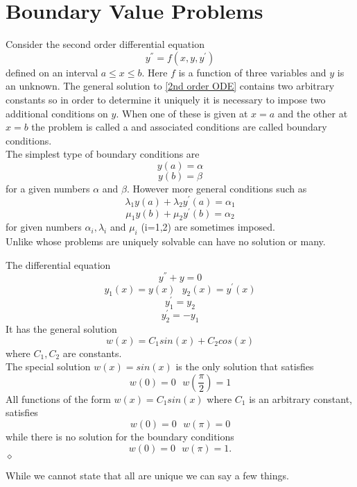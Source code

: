 \section{Boundary Value Problems}
Consider the second order differential equation
\begin{equation}
\label{2nd order ODE}
y^{''}=f(x,y,y^{'})
\end{equation}
defined on an interval $a \leq x \leq b$.  Here $f$ is a function of three variables and $y$ is an unknown.  The general solution to \ref{2nd order ODE}
contains two arbitrary constants so in order to determine it uniquely it is necessary to impose two additional conditions on $y$.  When one of these is given at $x=a$
and the other at $x=b$ the problem is called a 
 and associated conditions are called boundary conditions.\\
The simplest type of boundary conditions are
\[y(a)=\alpha\]
\[y(b)=\beta \]
for a given numbers $\alpha$ and $\beta$.  However more general conditions such as
\[\lambda_1 y(a)+\lambda_2 y^{'}(a)=\alpha_1 \]
\[\mu_1 y(b)+\mu_2 y^{'}(b)=\alpha_2 \]
for given numbers $\alpha_i, \lambda_i$ and $\mu_i$ (i=1,2) are sometimes imposed.\\
Unlike  whose problems are uniquely solvable  can have no solution or many.
\begin{example}
The differential equation
\[ y^{''}+y=0\]
\[y_1(x)=y(x) \ \ \ y_2(x)=y^{'}(x)\]
\[y^{'}_1=y_2 \]
\[y^{'}_2=-y_1 \]
It has the general solution 
\[w(x) = C_1sin(x)+C_2 cos(x)\]
where $C_1,C_2$ are constants.\\
The special solution $w(x)=sin(x)$ is the only solution that satisfies 
\[ w(0)=0 \ \ \ w(\frac{\pi}{2})=1 \]
All functions of the form $w(x)=C_1sin(x)$ where $C_1$ is an arbitrary constant,
satisfies
\[ w(0)=0 \ \ \ w(\pi)=0 \]
while there is no solution for the boundary conditions
\[ w(0)=0 \ \ \ w(\pi)=1. \]
 $\diamond$
\end{example}
While we cannot state that all  are unique we can say a few things.
